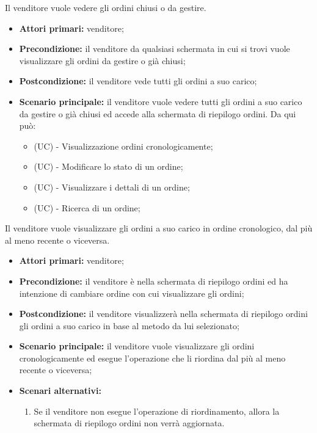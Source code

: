 Il venditore vuole vedere gli ordini chiusi o da gestire.
\begin{itemize}
    \item \textbf{Attori primari:} venditore;
    \item \textbf{Precondizione:} il venditore da qualsiasi schermata in cui si trovi vuole visualizzare gli ordini da gestire o già chiusi;
    \item \textbf{Postcondizione:} il venditore vede tutti gli ordini a suo carico;
    \item \textbf{Scenario principale:} il venditore vuole vedere tutti gli ordini a suo carico da gestire o già chiusi ed accede alla schermata di riepilogo ordini. Da qui può:
    \begin{itemize}
    	\item (UC) - Visualizzazione ordini cronologicamente;
        \item (UC) - Modificare lo stato di un ordine;
        \item (UC) - Visualizzare i dettali di un ordine;
        \item (UC) - Ricerca di un ordine;
    \end{itemize}
\end{itemize}

\resetSubUC
{}
Il venditore vuole visualizzare gli ordini a suo carico in ordine cronologico, dal più al meno recente o viceversa.
\begin{itemize}
	\item \textbf{Attori primari:} venditore;
	\item \textbf{Precondizione:} il venditore è nella schermata di riepilogo ordini ed ha intenzione di cambiare ordine con cui visualizzare gli ordini;
	\item \textbf{Postcondizione:} il venditore visualizzerà nella schermata di riepilogo ordini gli ordini a suo carico in base al metodo da lui selezionato;
	\item \textbf{Scenario principale:} il venditore vuole visualizzare gli ordini cronologicamente ed esegue l'operazione che li riordina dal più al meno recente o viceversa;
	\item \textbf{Scenari alternativi:}
	\begin{enumerate}[label=\lett]
		\item Se il venditore non esegue l'operazione di riordinamento, allora la schermata di riepilogo ordini non verrà aggiornata.
	\end{enumerate}
\end{itemize}

